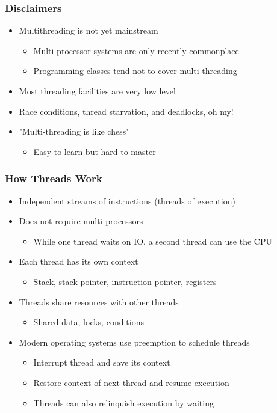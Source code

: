 \begin{slide}
\frametitle{Disclaimers}

\begin{itemize}
\item Multithreading is not yet mainstream
  \begin{itemize}
  \item Multi-processor systems are only recently commonplace
  \item Programming classes tend not to cover multi-threading
  \end{itemize}
\item Most threading facilities are very low level
\item Race conditions, thread starvation, and deadlocks, oh my!
\item "Multi-threading is like chess"
  \begin{itemize}
  \item Easy to learn but hard to master
  \end{itemize}
\end{itemize}

\end{slide}


\begin{slide}
\frametitle{How Threads Work}

\begin{itemize}
\item Independent streams of instructions (threads of execution)
\item Does not require multi-processors
  \begin{itemize}
  \item While one thread waits on IO, a second thread can use the CPU
  \end{itemize}
\item Each thread has its own context
  \begin{itemize}
  \item Stack, stack pointer, instruction pointer, registers
  \end{itemize}
\item Threads share resources with other threads
  \begin{itemize}
  \item Shared data, locks, conditions
  \end{itemize}
\vspace{1em}
\item Modern operating systems use preemption to schedule threads
  \begin{itemize}
  \item Interrupt thread and save its context
  \item Restore context of next thread and resume execution
  \item Threads can also relinquish execution by waiting
  \end{itemize}
\end{itemize}

\end{slide}

